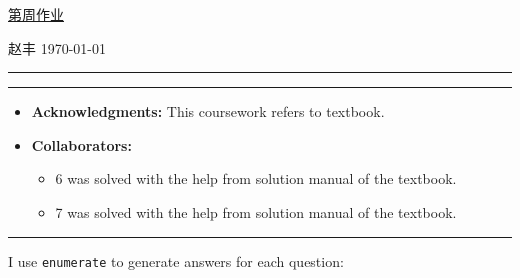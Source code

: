 \documentclass[a4paper]{article}
\begin{document}
\courseheader

\setcounter{hwcnt}{11} %

\begin{center}
  \underline{第\thehwcnt 周作业} \\
\end{center}
\begin{flushleft}
  赵丰\quad \studentID\hfill
  \today
\end{flushleft}
\hrule

\vspace{2em}

\flushleft
\rule{\textwidth}{1pt}
\begin{itemize}
\item {\bf Acknowledgments: \/} 
  This coursework refers to textbook.  
\item {\bf Collaborators: \/}
  \begin{itemize}
  \item 6 was solved with the help from solution manual of the textbook.  
  \item 7 was solved with the help from solution manual of the textbook.    
  \end{itemize}
\end{itemize}
\rule{\textwidth}{1pt}

\vspace{2em}

I use \texttt{enumerate} to generate answers for each question:
\end{document}
